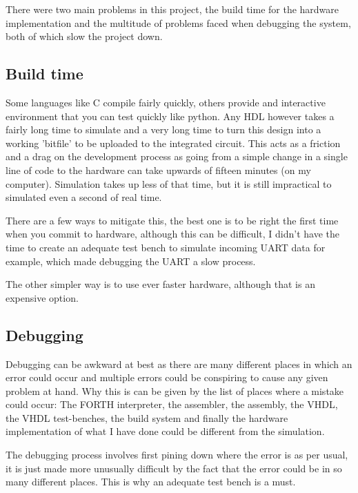 \documentclass	[a4paper, 10pt]	{article}
\begin{document}
    There were two main problems in this project, the build time for the hardware
    implementation and the multitude of problems faced when debugging the system,
    both of which slow the project down.

    \subsection{Build time}

    Some languages like C compile fairly quickly, others provide and interactive
    environment that you can test quickly like python. Any HDL however takes
    a fairly long time to simulate and a very long time to turn this design into
    a working 'bitfile' to be uploaded to the integrated circuit. This acts as
    a friction and a drag on the development process as going from a simple change
    in a single line of code to the hardware can take upwards of fifteen minutes
    (on my computer). Simulation takes up less of that time, but it is still
    impractical to simulated even a second of real time. 

    There are a few ways
    to mitigate this, the best one is to be right the first time when you commit
    to hardware, although this can be difficult, I didn't have the time to create
    an adequate test bench to simulate incoming UART data for example, which made
    debugging the UART a slow process.

    The other simpler way is to use ever faster hardware, although that is an
    expensive option.

    \subsection{Debugging}

    Debugging can be awkward at best as there are many different places in which
    an error could occur and multiple errors could be conspiring to cause any
    given problem at hand. Why this is can be given by the list of places where
    a mistake could occur: The FORTH interpreter, the assembler, the assembly, the
    VHDL, the VHDL test-benches, the build system and finally the hardware implementation
    of what I have done could be different from the simulation. 

    The debugging process involves first pining down where the error is as
    per usual, it is just made more unusually difficult by the fact that the error
    could be in so many different places. This is why an adequate test bench is
    a must.
\end{document}

